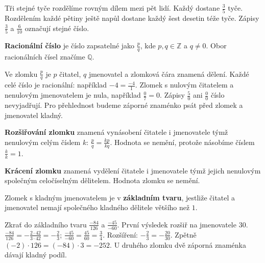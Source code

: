 \documentclass[11pt,a4paper]{article}
\begin{document}

Tři stejné tyče rozdělíme rovným dílem mezi pět lidí. Každý dostane
$\frac35$ tyče. Rozdělením každé pětiny ještě napůl dostane každý
šest desetin téže tyče. Zápisy $\frac35$ a $\frac6{10}$ označují stejné číslo.

\begin{definiceBox}[title={Definice - Racionální číslo}]
\textbf{Racionální číslo} je číslo zapsatelné jako $\frac pq$, kde
$p,q\in\mathbb Z$ a $q\ne0$. Obor racionálních čísel značíme $\mathbb Q$.
\end{definiceBox}

Ve zlomku $\frac pq$ je $p$ čitatel, $q$ jmenovatel a zlomková čára
znamená dělení. Každé celé číslo je racionální: například $-4=\frac{-4}{1}$.
Zlomek s nulovým čitatelem a nenulovým jmenovatelem je nula,
například $\frac07=0$. Zápisy $\frac50$ ani $\frac00$ číslo nevyjadřují.
Pro přehlednost budeme záporné znaménko psát před zlomek a jmenovatel kladný.

\begin{definiceBox}[title={Definice - Rozšiřování zlomků}]
\textbf{Rozšiřování zlomku} znamená vynásobení čitatele i jmenovatele
týmž nenulovým celým číslem $k$:
$\frac pq=\frac{kp}{kq}$. Hodnota se nemění, protože násobíme číslem $\frac kk=1$.
\end{definiceBox}

\begin{definiceBox}[title={Definice - Krácení zlomků}]
\textbf{Krácení zlomku} znamená vydělení čitatele i jmenovatele
týmž jejich nenulovým společným celočíselným dělitelem. Hodnota zlomku se nemění.
\end{definiceBox}

\begin{definiceBox}[title={Definice - Zlomek v základním tvaru}]
Zlomek s kladným jmenovatelem je v \textbf{základním tvaru}, jestliže
čitatel a jmenovatel nemají společného kladného dělitele většího než $1$.
\end{definiceBox}

\begin{prikladReseniBox}[title={Příklad 1},breakable=false]
Zkrať do základního tvaru $\frac{-84}{126}$ a $\frac{-45}{-60}$.
První výsledek rozšiř na jmenovatele $30$.
\tcblower
$\frac{-84}{126}=-\frac{2\cdot42}{3\cdot42}=-\frac23$;
$\frac{-45}{-60}=\frac{45}{60}=\frac34$.
Rozšíření: $-\frac23=-\frac{20}{30}$. Zpětně $(-2)\cdot126=(-84)\cdot3=-252$.
U druhého zlomku dvě záporná znaménka dávají kladný podíl.
\end{prikladReseniBox}
\end{document}
